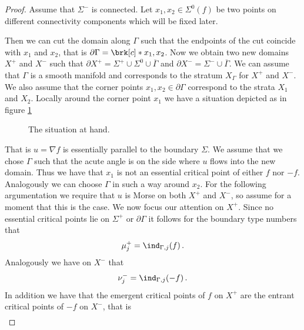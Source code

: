 \begin{proof}
  Assume that $\Sigma^-$ is connected.
  Let $x_1,x_2\in\Sigma^0(f)$ be two points on different connectivity components which will be fixed later.

  Then we can cut the domain along $\Gamma$ such that the endpoints
  of the cut coincide with $x_1$ and $x_2$, that is $\partial\Gamma=\brk[c]*{x_1,x_2}$.
  Now we obtain two new domains $X^+$ and $X^-$ such that $\partial X^+ =\Sigma^+\cup\Sigma^0\cup\overline{\Gamma}$ and
  $\partial X^-=\Sigma^-\cup\overline{\Gamma}$. We can assume that $\Gamma$ is a smooth manifold and corresponds to the stratum 
  $X_\Gamma$ for $X^+$ and $X^-$. We also assume that the corner points $x_1,x_2\in\partial\Gamma$ correspond to the strata $X_{1}$ and $X_{2}$.
  Locally around the corner point $x_1$ we have a situation depicted as in figure \ref{}
  \begin{figure}
    \centering
    
    \caption{The situation at hand.}
    \label{}
  \end{figure}
  That is $u=\nabla f$ is essentially parallel to the boundary $\Sigma$.
  We assume that we chose $\Gamma$ such that the acute angle is on the side where $u$ flows into the new domain.
  Thus we have that $x_1$ is not an essential critical point of either $f$ nor $-f$.
  Analogously we can choose $\Gamma$ in such a way around $x_2$.
  For the following argumentation we require that $u$ is Morse on both $X^+$ and $X^-$, so assume for a moment that this
  is the case.
  We now focus our attention on $X^+$. Since no essential critical points lie on $\Sigma^+$ or
  $\partial\Gamma$ it follows for the boundary type numbers that
  \begin{align}
    \mu^+_j=\ind_{\Gamma,j}(f)\,.\label{eq:n2_disproof_morse_muplus}
  \end{align}
  Analogously we have on $X^-$ that
  \begin{align}
    \nu^-_j=\ind_{\Gamma,j}(-f)\,.\label{eq:n2_disproof_morse_numinus}
  \end{align}
  In addition we have that the emergent critical points of $f$ on $X^+$ are the
  entrant critical points of $-f$ on $X^-$, that is
  \begin{align}

\end{align}
\end{proof}
